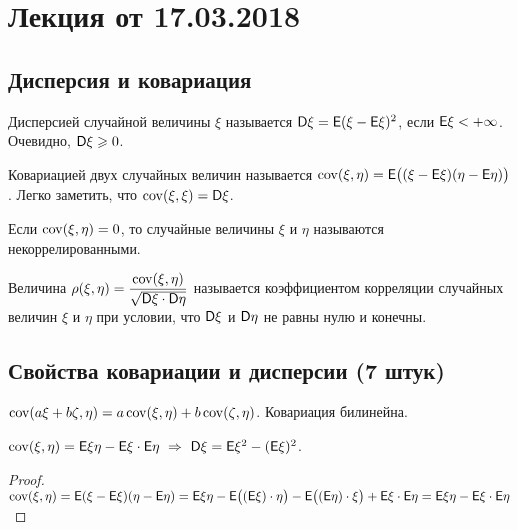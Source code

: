 \section{Лекция от 17.03.2018}
\subsection{Дисперсия и ковариация}
\begin{definition}
	Дисперсией случайной величины $\xi$ называется $\mathsf{D} \xi = \mathsf{E} (\xi - \mathsf{E} \xi)^2 $, если $\mathsf{E}{\xi} < + \infty$. Очевидно, $\mathsf{D}{\xi} \geqslant 0$.
\end{definition}

\begin{definition}
	Ковариацией двух случайных величин называется $\operatorname{cov} (\xi, \eta) = \mathsf{E} \big( ( \xi - \mathsf{E} \xi)(\eta - \mathsf{E} \eta ) \big)$. Легко заметить, что $\operatorname{cov} (\xi, \xi ) = \mathsf{D} \xi$.
\end{definition}

\begin{definition}
    Если $\operatorname{cov}(\xi, \eta) = 0$, то случайные величины $\xi$ и $\eta$ называются некоррелированными.
\end{definition}

\begin{definition}
	Величина $\rho ( \xi, \eta ) = \dfrac{\operatorname{cov} ( \xi, \eta )}{\sqrt{\mathsf{D} \xi \cdot \mathsf{D} \eta}}$ называется коэффициентом корреляции случайных величин $\xi$ и $\eta$ при условии, что $\mathsf{D} \xi$ и $\mathsf{D} \eta$ не равны нулю и конечны.
\end{definition}

\subsection{Свойства ковариации и дисперсии (7 штук)}
\setcounter{property}{0}
\begin{property}
	$\operatorname{cov}( a \xi + b \zeta, \eta ) = a \operatorname{cov} (\xi, \eta) + b \operatorname{cov} (\zeta, \eta)$. Ковариация билинейна.
\end{property}

\begin{property}
	$\operatorname{cov}( \xi,  \eta ) = \mathsf{E} \xi \eta - \mathsf{E} \xi \cdot \mathsf{E} \eta ~\Rightarrow ~ \mathsf{D} \xi = \mathsf{E} \xi^2 - ( \mathsf{E} \xi )^2$.
	\begin{proof}
		$\operatorname{cov} (\xi, \eta ) = \mathsf{E} (\xi - \mathsf{E} \xi)( \eta - \mathsf{E} \eta) = \mathsf{E} \xi \eta - \mathsf{E} \big( ( \mathsf{E} \xi ) \cdot \eta \big) - \mathsf{E} \big( (\mathsf{E} \eta ) \cdot \xi \big) + \mathsf{E} \xi \cdot \mathsf{E} \eta = \mathsf{E} \xi \eta - \mathsf{E} \xi \cdot \mathsf{E} \eta $
	\end{proof}
\end{property}

